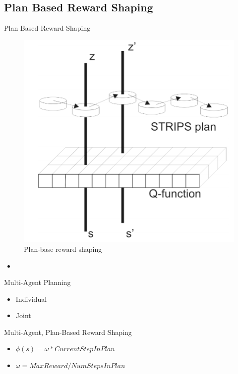 \documentclass{bredelebeamer}
\begin{document}
\subsection{Plan Based Reward Shaping}
\begin{frame}{Plan Based Reward Shaping}

\begin{figure}[h!]
\centering
  \includegraphics[height=0.5\textheight]{../article/img/strips.png}
  \caption{Plan-base reward shaping}
  \label{fig:strips}
\end{figure}

\begin{block}{}
\begin{itemize}
\item 
\end{itemize}
\end{block}

\end{frame}


\begin{frame}{Multi-Agent Planning}

\begin{block}{}
\begin{itemize}
\item Individual
\item Joint
\end{itemize}
\end{block}

\begin{block}{Multi-Agent, Plan-Based Reward Shaping}
\begin{itemize}
\item $\phi (s) = \omega * CurrentStepInPlan$
\item $\omega = MaxReward/NumStepsInPlan$
\end{itemize}
\end{block}

\end{frame}
\end{document}
